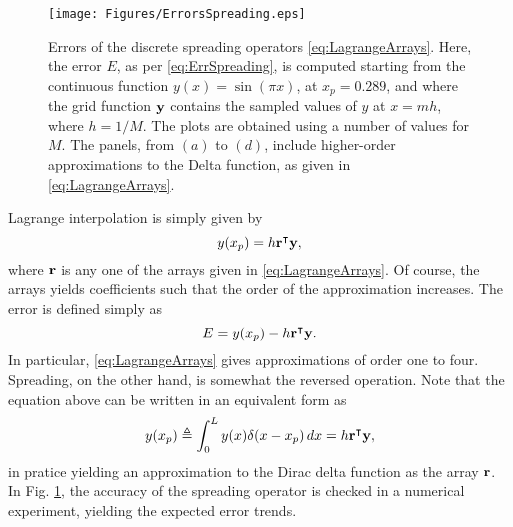 \begin{figure}[hbt]
\centering
\texttt{[image: Figures/ErrorsSpreading.eps]}
\caption{Errors of the discrete spreading operators \eqref{eq:LagrangeArrays}. Here, the error $E$, as per \eqref{eq:ErrSpreading}, is computed starting from the continuous function $y(x) = \sin (\pi x)$, at $x_p=0.289$, and where the grid function ${\bf y}$ contains the sampled values of $y$ at $x=mh$, where $h=1/M$. The plots are obtained using a number of values for $M$. The panels, from $(a)$ to $(d)$, include higher-order approximations to the Delta function, as given in \eqref{eq:LagrangeArrays}.}\label{fig:ErrsLagrange}
\end{figure}
Lagrange interpolation is simply given by
\begin{equation}
y(x_p) = h{\bf r}^\intercal {\bf y},
\end{equation}
where $\bf r$ is any one of the arrays given in \eqref{eq:LagrangeArrays}. Of course, the arrays yields coefficients such that the order of the approximation increases. The error is defined simply as
\begin{equation}\label{eq:ErrSpreading}
E = y(x_p)-h{\bf r}^\intercal {\bf y}.
\end{equation}
In particular, \eqref{eq:LagrangeArrays} gives approximations of order one to four. Spreading, on the other hand, is somewhat the reversed operation. Note that the equation above can be written in an equivalent form as
\begin{equation}
y(x_p) \triangleq \int_0^L y(x) \delta(x-x_p)\, dx = h{\bf r}^\intercal {\bf y},
\end{equation}
in pratice yielding an approximation to the Dirac delta function as the array $\bf r$. In Fig. \ref{fig:ErrsLagrange}, the accuracy of the spreading operator is checked in a numerical experiment, yielding the expected error trends. 

